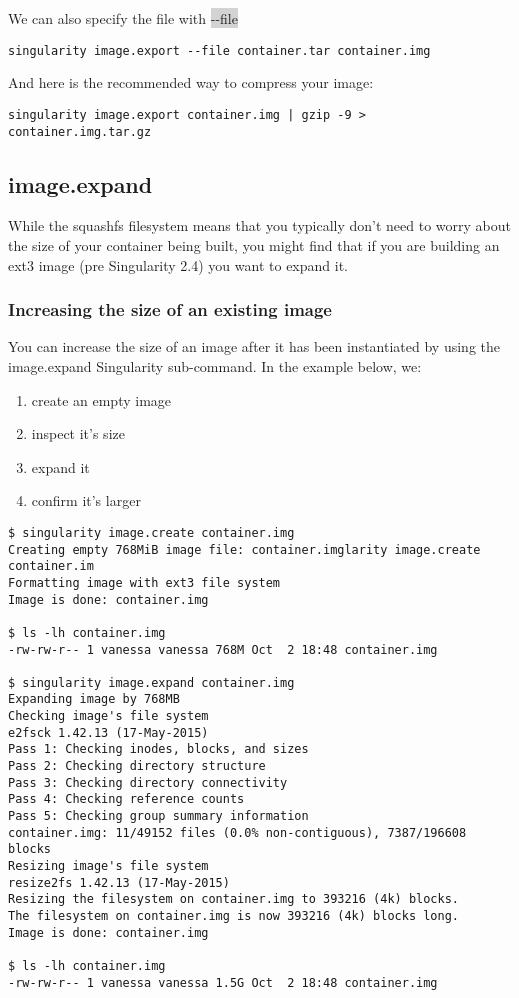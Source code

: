 \documentclass[a4paper]{article}
\begin{document}
We can also specify the file with \colorbox{lightgray}{-{}-file}
\begin{lstlisting}[frame=single]
singularity image.export --file container.tar container.img
\end{lstlisting}
And here is the recommended way to compress your image:
\begin{lstlisting}[frame=single]
singularity image.export container.img | gzip -9 > container.img.tar.gz
\end{lstlisting}
\subsection{image.expand}
\label{sec:imageexpand}

While the squashfs filesystem means that you typically don’t need to worry about the size of your container being built, you might find that if you are building an ext3 image (pre Singularity 2.4) you want to expand it.

\subsubsection{Increasing the size of an existing image}

You can increase the size of an image after it has been instantiated by using the image.expand Singularity sub-command. In the example below, we:\\[0.1in]

\begin{enumerate}
\item create an empty image
\item inspect it’s size
\item expand it
\item confirm it’s larger
\end{enumerate}

\begin{lstlisting}[frame=single]
$ singularity image.create container.img
Creating empty 768MiB image file: container.imglarity image.create container.im 
Formatting image with ext3 file system
Image is done: container.img

$ ls -lh container.img 
-rw-rw-r-- 1 vanessa vanessa 768M Oct  2 18:48 container.img

$ singularity image.expand container.img
Expanding image by 768MB
Checking image's file system
e2fsck 1.42.13 (17-May-2015)
Pass 1: Checking inodes, blocks, and sizes
Pass 2: Checking directory structure
Pass 3: Checking directory connectivity
Pass 4: Checking reference counts
Pass 5: Checking group summary information
container.img: 11/49152 files (0.0% non-contiguous), 7387/196608 blocks
Resizing image's file system
resize2fs 1.42.13 (17-May-2015)
Resizing the filesystem on container.img to 393216 (4k) blocks.
The filesystem on container.img is now 393216 (4k) blocks long.
Image is done: container.img

$ ls -lh container.img 
-rw-rw-r-- 1 vanessa vanessa 1.5G Oct  2 18:48 container.img
\end{lstlisting}
\end{document}
